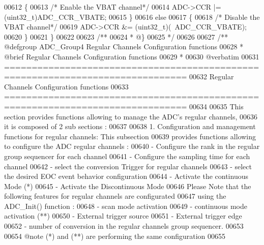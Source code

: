 \begin{DoxyCode}
00612   \{
00613     \textcolor{comment}{/* Enable the VBAT channel*/}
00614     ADC->CCR |= (uint32\_t)ADC_CCR_VBATE;
00615   \}
00616   \textcolor{keywordflow}{else}
00617   \{
00618     \textcolor{comment}{/* Disable the VBAT channel*/}
00619     ADC->CCR &= (uint32\_t)(~ADC_CCR_VBATE);
00620   \}
00621 \}
00622 
00623 \textcolor{comment}{/**}
00624 \textcolor{comment}{  * @\}}
00625 \textcolor{comment}{  */}
00626 
00627 \textcolor{comment}{/** @defgroup ADC\_Group4 Regular Channels Configuration functions}
00628 \textcolor{comment}{ *  @brief   Regular Channels Configuration functions }
00629 \textcolor{comment}{ *}
00630 \textcolor{comment}{@verbatim   }
00631 \textcolor{comment}{ ===============================================================================}
00632 \textcolor{comment}{                  Regular Channels Configuration functions}
00633 \textcolor{comment}{ ===============================================================================  }
00634 \textcolor{comment}{}
00635 \textcolor{comment}{  This section provides functions allowing to manage the ADC's regular channels,}
00636 \textcolor{comment}{  it is composed of 2 sub sections : }
00637 \textcolor{comment}{  }
00638 \textcolor{comment}{  1. Configuration and management functions for regular channels: This subsection }
00639 \textcolor{comment}{     provides functions allowing to configure the ADC regular channels :    }
00640 \textcolor{comment}{          - Configure the rank in the regular group sequencer for each channel}
00641 \textcolor{comment}{          - Configure the sampling time for each channel}
00642 \textcolor{comment}{          - select the conversion Trigger for regular channels}
00643 \textcolor{comment}{          - select the desired EOC event behavior configuration}
00644 \textcolor{comment}{          - Activate the continuous Mode  (*)}
00645 \textcolor{comment}{          - Activate the Discontinuous Mode }
00646 \textcolor{comment}{     Please Note that the following features for regular channels are configurated}
00647 \textcolor{comment}{     using the ADC\_Init() function : }
00648 \textcolor{comment}{          - scan mode activation }
00649 \textcolor{comment}{          - continuous mode activation (**) }
00650 \textcolor{comment}{          - External trigger source  }
00651 \textcolor{comment}{          - External trigger edge }
00652 \textcolor{comment}{          - number of conversion in the regular channels group sequencer.}
00653 \textcolor{comment}{     }
00654 \textcolor{comment}{     @note (*) and (**) are performing the same configuration}
00655 \textcolor{comment}{     }

\end{DoxyCode}

